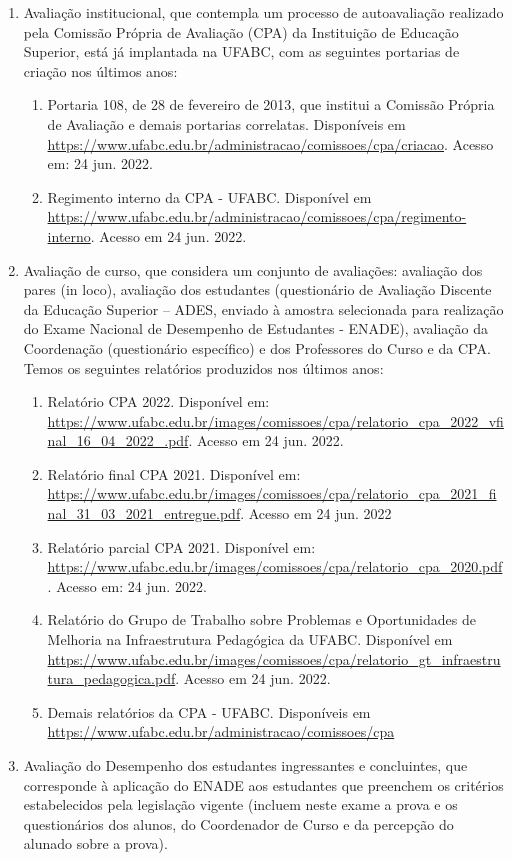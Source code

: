 \begin{enumerate}
	\item Avaliação institucional, que contempla um processo de autoavaliação realizado pela Comissão Própria de Avaliação (CPA) da Instituição de Educação Superior, está já implantada na UFABC, com as seguintes portarias de criação nos últimos anos:
	\begin{enumerate}
		\item Portaria 108, de 28 de fevereiro de 2013, que institui a Comissão Própria de Avaliação e demais portarias correlatas. Disponíveis em
		\url{https://www.ufabc.edu.br/administracao/comissoes/cpa/criacao}. Acesso em: 24 jun. 2022.
		\item Regimento interno da CPA - UFABC. Disponível em \url{https://www.ufabc.edu.br/administracao/comissoes/cpa/regimento-interno}. Acesso em 24 jun. 2022.
	\end{enumerate}
	
	\item Avaliação de curso, que considera um conjunto de avaliações: avaliação dos pares (in loco), avaliação dos estudantes (questionário de Avaliação Discente da Educação Superior – ADES, enviado à amostra selecionada para realização do Exame Nacional de Desempenho de Estudantes - ENADE), avaliação da Coordenação (questionário específico) e dos Professores do Curso e da CPA. Temos os seguintes relatórios produzidos nos últimos anos:
	\begin{enumerate}
		\item Relatório CPA 2022. Disponível em:
		\url{https://www.ufabc.edu.br/images/comissoes/cpa/relatorio_cpa_2022_vfinal_16_04_2022_.pdf}. Acesso em 24 jun. 2022.
		\item Relatório final CPA 2021. Disponível em:
		\url{https://www.ufabc.edu.br/images/comissoes/cpa/relatorio_cpa_2021_final_31_03_2021_entregue.pdf}. Acesso em 24 jun. 2022
		\item Relatório parcial CPA 2021. Disponível em:
		\url{https://www.ufabc.edu.br/images/comissoes/cpa/relatorio_cpa_2020.pdf}. Acesso em: 24 jun. 2022.
		\item Relatório do Grupo de Trabalho sobre Problemas e Oportunidades de Melhoria na Infraestrutura Pedagógica da UFABC. Disponível em \url {https://www.ufabc.edu.br/images/comissoes/cpa/relatorio_gt_infraestrutura_pedagogica.pdf}. Acesso em 24 jun. 2022.
		\item Demais relatórios da CPA - UFABC. Disponíveis em  \url{https://www.ufabc.edu.br/administracao/comissoes/cpa}
	\end{enumerate}
	
	\item Avaliação do Desempenho dos estudantes ingressantes e concluintes, que corresponde à aplicação do ENADE aos estudantes que preenchem os critérios estabelecidos pela legislação vigente (incluem neste exame a prova e os questionários dos alunos, do Coordenador de Curso e da percepção do alunado sobre a prova).
\end{enumerate}

